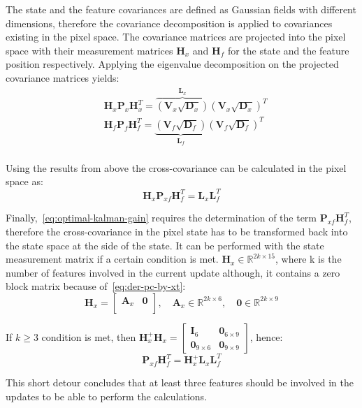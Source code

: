 The state and the feature covariances are defined as Gaussian fields with different dimensions, therefore the covariance decomposition is applied to covariances existing in the pixel space. The covariance matrices are projected into the pixel space with their measurement matrices $\mathbf{H}_x$ and $\mathbf{H}_f$ for the state and the feature position respectively. Applying the eigenvalue decomposition on the projected covariance matrices yields:
\begin{equation}
\begin{aligned}
    & \mathbf{H}_x\mathbf{P}_x\mathbf{H}_x^T=\overbrace{\left(\mathbf{V}_x\sqrt{\mathbf{D}_x}\right)}^{\mathbf{L}_x}\left(\mathbf{V}_x\sqrt{\mathbf{D}_x}\right)^T \\
    & \mathbf{H}_f\mathbf{P}_f\mathbf{H}_f^T=\underbrace{\left(\mathbf{V}_f\sqrt{\mathbf{D}_f}\right)}_{\mathbf{L}_f}\left(\mathbf{V}_f\sqrt{\mathbf{D}_f}\right)^T \\
\end{aligned}
\end{equation}

Using the results from above the cross-covariance can be calculated in the pixel space as:
\begin{equation}
    \mathbf{H}_x\mathbf{P}_{xf}\mathbf{H}_f^T=\mathbf{L}_x\mathbf{L}_f^T
\end{equation}

Finally,~\eqref{eq:optimal-kalman-gain} requires the determination of the term $\mathbf{P}_{xf}\mathbf{H}_{f}^T$, therefore the cross-covariance in the pixel state has to be transformed back into the state space at the side of the state. It can be performed with the state measurement matrix if a certain condition is met. $\mathbf{H}_x\in\mathbb{R}^{2k\times 15}$, where k is the number of features involved in the current update although, it contains a zero block matrix because of~\eqref{eq:der-pc-by-xt}:
\begin{equation}
    \mathbf{H}_x = \begin{bmatrix}
    \mathbf{A}_x & \mathbf{0} \\
    \end{bmatrix}, \quad \mathbf{A}_x\in\mathbb{R}^{2k\times 6}, \quad \mathbf{0}\in\mathbb{R}^{2k\times 9}
\end{equation}

If $k\geq 3$ condition is met, then $\mathbf{H}_x^+\mathbf{H}_x=\begin{bmatrix}\mathbf{I}_6 & \mathbf{0}_{6\times 9} \\ \mathbf{0}_{9\times 6} & \mathbf{0}_{9\times 9}\end{bmatrix}$, hence:
\begin{equation}
    \mathbf{P}_{xf}\mathbf{H}_f^T = \mathbf{H}_x^+\mathbf{L}_x\mathbf{L}_f^T
\end{equation}

This short detour concludes that at least three features should be involved in the updates to be able to perform the calculations.
